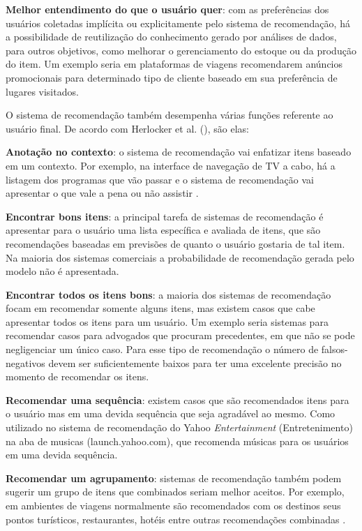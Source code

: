 \textbf{Melhor entendimento do que o usuário quer}: com as preferências dos usuários coletadas implícita ou explicitamente pelo sistema de recomendação, há a possibilidade de reutilização do conhecimento gerado por análises de dados, para outros objetivos, como melhorar o gerenciamento do estoque ou da produção do item. Um exemplo seria em plataformas de viagens recomendarem anúncios promocionais para determinado tipo de cliente baseado em sua preferência de lugares visitados.

O sistema de recomendação também desempenha várias funções referente ao usuário final. De acordo com Herlocker et al. (\citeyear{Herlocker:2004}), são elas:

\textbf{Anotação no contexto}: o sistema de recomendação vai enfatizar itens baseado em um contexto. Por exemplo, na interface de navegação de TV a cabo, há a listagem dos programas que vão passar e o sistema de recomendação vai apresentar o que vale a pena ou não assistir \cite{Ricci:2010}.

\textbf{Encontrar bons itens}: a principal tarefa de sistemas de recomendação é apresentar para o usuário uma lista específica e avaliada de itens, que são recomendações baseadas em previsões de quanto o usuário gostaria de tal item. Na maioria dos sistemas comerciais a probabilidade de recomendação gerada pelo modelo não é apresentada.

\textbf{Encontrar todos os itens bons}: a maioria dos sistemas de recomendação focam em recomendar somente alguns itens, mas existem casos que cabe apresentar todos os itens para um usuário. Um exemplo seria sistemas para recomendar casos para advogados que procuram precedentes, em que não se pode negligenciar um único caso. Para esse tipo de recomendação o número de falsos-negativos devem ser suficientemente baixos para ter uma excelente precisão no momento de recomendar os itens.

\textbf{Recomendar uma sequência}: existem casos que são recomendados itens para o usuário mas em uma devida sequência que seja agradável ao mesmo. Como utilizado no sistema de recomendação do Yahoo \textit{Entertainment} (Entretenimento) na aba de musicas (launch.yahoo.com), que recomenda músicas para os usuários em uma devida sequência.

\textbf{Recomendar um agrupamento}: sistemas de recomendação também podem sugerir um grupo de itens que combinados seriam melhor aceitos. Por exemplo, em ambientes de viagens normalmente são recomendados com os destinos seus pontos turísticos, restaurantes, hotéis entre outras recomendações combinadas \cite{Ricci:2010}.

